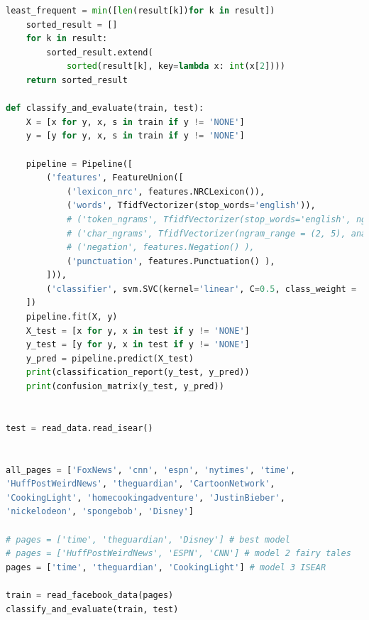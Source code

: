 \documentclass[11pt]{article}
\begin{document}
\begin{lstlisting}[language=Python]
    least_frequent = min([len(result[k])for k in result])
    sorted_result = []
    for k in result:
        sorted_result.extend(
            sorted(result[k], key=lambda x: int(x[2])))
    return sorted_result

def classify_and_evaluate(train, test):
    X = [x for y, x, s in train if y != 'NONE']
    y = [y for y, x, s in train if y != 'NONE']

    pipeline = Pipeline([
        ('features', FeatureUnion([
            ('lexicon_nrc', features.NRCLexicon()),
            ('words', TfidfVectorizer(stop_words='english')),
            # ('token_ngrams', TfidfVectorizer(stop_words='english', ngram_range = (2, 5))),
            # ('char_ngrams', TfidfVectorizer(ngram_range = (2, 5), analyzer = 'char')),
            # ('negation', features.Negation() ),  
            ('punctuation', features.Punctuation() ),  
        ])),
        ('classifier', svm.SVC(kernel='linear', C=0.5, class_weight = 'balanced'))
    ])
    pipeline.fit(X, y)
    X_test = [x for y, x in test if y != 'NONE']
    y_test = [y for y, x in test if y != 'NONE']
    y_pred = pipeline.predict(X_test)
    print(classification_report(y_test, y_pred))
    print(confusion_matrix(y_test, y_pred))


test = read_data.read_isear()


all_pages = ['FoxNews', 'cnn', 'espn', 'nytimes', 'time',
'HuffPostWeirdNews', 'theguardian', 'CartoonNetwork',
'CookingLight', 'homecookingadventure', 'JustinBieber',
'nickelodeon', 'spongebob', 'Disney']

# pages = ['time', 'theguardian', 'Disney'] # best model
# pages = ['HuffPostWeirdNews', 'ESPN', 'CNN'] # model 2 fairy tales
pages = ['time', 'theguardian', 'CookingLight'] # model 3 ISEAR

train = read_facebook_data(pages)
classify_and_evaluate(train, test)
\end{lstlisting}
\clearpage
\end{document}
